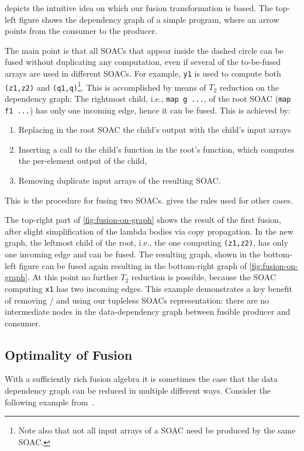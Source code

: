  depicts the intuitive idea on which our
fusion transformation is based.  The top-left figure shows the
dependency graph of a simple program, where an arrow points from the
consumer to the producer.

The main point is that all SOACs that appear inside the dashed circle
can be fused without duplicating any computation, even if several of
the to-be-fused arrays are used in different SOACs.  For example,
\texttt{y1} is used to compute both \texttt{(z1,z2)} and
\texttt{(q1,q)}\footnote{Note also that not all input arrays of a SOAC
  need be produced by the same SOAC.}.  This is accomplished by means
of $T_2$ reduction on the dependency graph: The rightmost child, i.e.,
\lstinline{map g ...}, of the root SOAC (\lstinline{map f1 ...})  has
only one incoming edge, hence it can be fused.  This is achieved by:
\begin{enumerate}
\item Replacing in the root SOAC the child's output with the child's
  input arrays
\item Inserting a call to the child's function in the root's function,
  which computes the per-element output of the child,
\item Removing duplicate input arrays of the resulting SOAC.
\end{enumerate}
This is the procedure for fusing two  SOACs.
 gives the rules used for other cases.

The top-right part of \cref{fig:fusion-on-graph} shows the result of
the first fusion, after slight simplification of the lambda bodies via
copy propagation.  In the new graph, the leftmost child of the root,
i.e., the one computing \texttt{(z1,z2)}, has only one incoming edge
and can be fused.  The resulting graph, shown in the bottom-left
figure can be fused again resulting in the bottom-right graph of
\cref{fig:fusion-on-graph}.  At this point no further $T_2$ reduction
is possible, because the SOAC computing \texttt{x1} has two incoming
edges.  This example demonstrates a key benefit of removing
/ and using our tupleless SOACs representation:
there are no intermediate nodes in the data-dependency graph between
fusible producer and consumer.

\subsection{Optimality of Fusion}

With a sufficiently rich fusion algebra it is sometimes the case that
the data dependency graph can be reduced in multiple different ways.
Consider the following example
from~\cite{Robinson:2014:FFI:2636228.2636235}.


